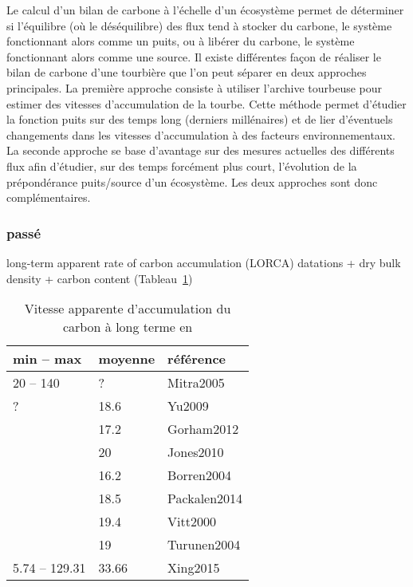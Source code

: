 Le calcul d'un bilan de carbone à l'échelle d'un écosystème permet de déterminer si l'équilibre (où le déséquilibre) des flux tend à stocker du carbone, le système fonctionnant alors comme un puits, ou à libérer du carbone, le système fonctionnant alors comme une source.
Il existe différentes façon de réaliser le bilan de carbone d'une tourbière que l'on peut séparer en deux approches principales.
La première approche consiste à utiliser l'archive tourbeuse pour estimer des vitesses d'accumulation de la tourbe.
Cette méthode permet d'étudier la fonction puits sur des temps long (derniers millénaires) et de lier d'éventuels changements dans les vitesses d'accumulation à des facteurs environnementaux.
La seconde approche se base d'avantage sur des mesures actuelles des différents flux afin d'étudier, sur des temps forcément plus court, l'évolution de la prépondérance puits/source d'un écosystème.
Les deux approches sont donc complémentaires.

\subsubsection{passé}
long-term apparent rate of carbon accumulation (LORCA) 
datations + dry bulk density + carbon content
(Tableau~\ref{table:lorca})

\begin{table}
\centering
\caption{Vitesse apparente d'accumulation du carbon à long terme en \si{\gcms}}
\label{table:lorca}
\begin{tabular}{llp{7cm}}\toprule
min -- max & moyenne & référence \\ \midrule
20 -- 140  & ? & Mitra2005 \\ %
? & 18.6 &  Yu2009\\  %
 & 17.2 & Gorham2012 \\  %
 & 20 & Jones2010\\  %
 & 16.2 & Borren2004\\  %
 & 18.5 & Packalen2014\\ %
 & 19.4 & Vitt2000\\ %
 & 19 & Turunen2004\\ %
5.74 -- 129.31 & 33.66 & Xing2015\\
\bottomrule
\end{tabular}
\end{table}

